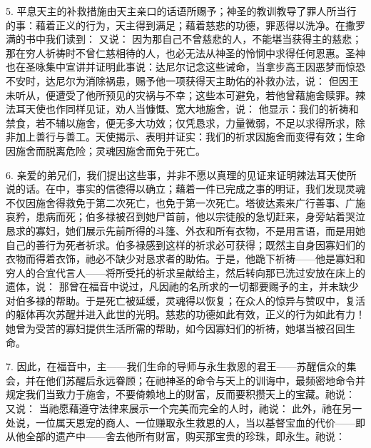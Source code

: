5. 平息天主的补救措施由天主亲口的话语所赐予；神圣的教训教导了罪人所当行的事：藉着正义的行为，天主得到满足；藉着慈悲的功德，罪恶得以洗净。在撒罗满的书中我们读到： 又说： 因为那自己不曾慈悲的人，不能堪当获得主的慈悲；那在穷人祈祷时不曾仁慈相待的人，也必无法从神圣的怜悯中求得任何恩惠。圣神也在圣咏集中宣讲并证明此事说：达尼尔记念这些诫命，当拿步高王因恶梦而惊恐不安时，达尼尔为消除祸患，赐予他一项获得天主助佑的补救办法，说： 但因王未听从，便遭受了他所预见的灾祸与不幸；这些本可避免，若他曾藉施舍赎罪。辣法耳天使也作同样见证，劝人当慷慨、宽大地施舍，说： 他显示：我们的祈祷和禁食，若不辅以施舍，便无多大功效；仅凭恳求，力量微弱，不足以求得所求，除非加上善行与善工。天使揭示、表明并证实：我们的祈求因施舍而变得有效；生命因施舍而脱离危险；灵魂因施舍而免于死亡。\par

6. 亲爱的弟兄们，我们提出这些事，并非不愿以真理的见证来证明辣法耳天使所说的话。在中，事实的信德得以确立；藉着一件已完成之事的明证，我们发现灵魂不仅因施舍得救免于第二次死亡，也免于第一次死亡。塔彼达素来广行善事、广施哀矜，患病而死；伯多禄被召到她尸首前，他以宗徒般的急切赶来，身旁站着哭泣恳求的寡妇，她们展示先前所得的斗篷、外衣和所有衣物，不是用言语，而是用她自己的善行为死者祈求。伯多禄感到这样的祈求必可获得；既然主自身因寡妇们的衣物而得着衣饰，祂必不缺少对恳求者的助佑。于是，他跪下祈祷——他是寡妇和穷人的合宜代言人——将所受托的祈求呈献给主，然后转向那已洗过安放在床上的遗体，说： 那曾在福音中说过，凡因祂的名所求的一切都要赐予的主，并未缺少对伯多禄的帮助。于是死亡被延缓，灵魂得以恢复；在众人的惊异与赞叹中，复活的躯体再次苏醒并进入此世的光明。慈悲的功德如此有效，正义的行为如此有力！她曾为受苦的寡妇提供生活所需的帮助，如今因寡妇们的祈祷，她堪当被召回生命。\par

7. 因此，在福音中，主——我们生命的导师与永生救恩的君王——苏醒信众的集会，并在他们苏醒后永远眷顾；在祂神圣的命令与天上的训诲中，最频密地命令并规定我们当致力于施舍，不要倚赖地上的财富，反而要积攒天上的宝藏。祂说： 又说： 当祂愿藉遵守法律来展示一个完美而完全的人时，祂说： 此外，祂在另一处说，一位属天恩宠的商人、一位赚取永生救恩的人，当以基督宝血的代价——即从他全部的遗产中——舍去他所有财富，购买那宝贵的珍珠，即永生。祂说：\par

